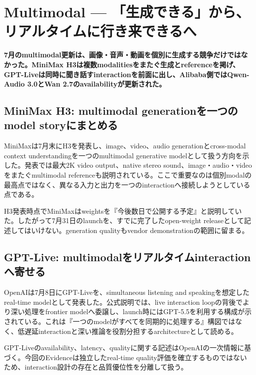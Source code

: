 \section{Multimodal — 「生成できる」から、リアルタイムに行き来できるへ}
\label{pkg:multimodal-july}
\noindent\textbf{7月のmultimodal更新は、画像・音声・動画を個別に生成する競争だけではなかった。MiniMax H3は複数modalitiesをまたぐ生成とreferenceを掲げ、GPT-Liveは同時に聞き話すinteractionを前面に出し、Alibaba側ではQwen-Audio 3.0とWan 2.7のavailabilityが更新された。}\autocite{src-3fb14968493d,src-d8e13386974c,src-eac8dfbeb78c}

\subsection{MiniMax H3: multimodal generationを一つのmodel storyにまとめる}

MiniMaxは7月末にH3を発表し、image、video、audio generationとcross-modal context understandingを一つのmultimodal generative modelとして扱う方向を示した。発表では最大2K video output、native stereo sound、image・audio・videoをまたぐmultimodal referenceも説明されている。ここで重要なのは個別modalの最高点ではなく、異なる入力と出力を一つのinteractionへ接続しようとしている点である。\autocite{src-d8e13386974c}


\begin{claimboundary}
H3発表時点でMiniMaxはweightsを『今後数日で公開する予定』と説明していた。したがって7月31日のlaunchを、すでに完了したopen-weight releaseとして記述してはいけない。generation qualityもvendor demonstrationの範囲に留まる。\autocite{src-d8e13386974c}
\end{claimboundary}

\subsection{GPT-Live: multimodalをリアルタイムinteractionへ寄せる}

OpenAIは7月8日にGPT-Liveを、simultaneous listening and speakingを想定したreal-time modelとして発表した。公式説明では、live interaction loopの背後でより深い処理をfrontier modelへ委譲し、launch時にはGPT-5.5を利用する構成が示されている。これは『一つのmodelがすべてを同期的に処理する』構図ではなく、低遅延interactionと深い推論を役割分担するarchitectureとして読める。\autocite{src-3fb14968493d}


\begin{claimboundary}
GPT-Liveのavailability、latency、qualityに関する記述はOpenAIの一次情報に基づく。今回のEvidenceは独立したreal-time quality評価を確立するものではないため、interaction設計の存在と品質優位性を分離して扱う。\autocite{src-3fb14968493d}
\end{claimboundary}

